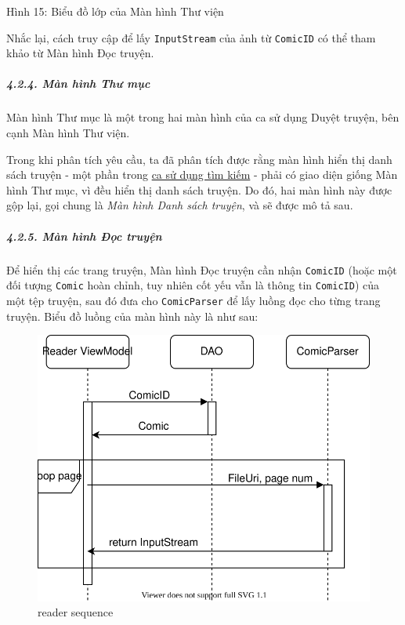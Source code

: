 \documentclass[
]{article}
\begin{document}
Hình 15: Biểu đồ lớp của Màn hình Thư viện

Nhắc lại, cách truy cập để lấy \texttt{InputStream} của ảnh từ
\texttt{ComicID} có thể tham khảo từ Màn hình Đọc truyện.

\hypertarget{muxe0n-huxecnh-thux1b0-mux1ee5c}{%
\subparagraph{\texorpdfstring{4.2.4. Màn hình Thư mục
}{4.2.4. Màn hình Thư mục }}\label{muxe0n-huxecnh-thux1b0-mux1ee5c}}

Màn hình Thư mục là một trong hai màn hình của ca sử dụng Duyệt truyện,
bên cạnh Màn hình Thư viện.

Trong khi phân tích yêu cầu, ta đã phân tích được rằng màn hình hiển thị
danh sách truyện - một phần trong
\protect\hyperlink{P3.3.5-search-comic}{ca sử dụng tìm kiếm} - phải có
giao diện giống Màn hình Thư mục, vì đều hiển thị danh sách truyện. Do
đó, hai màn hình này được gộp lại, gọi chung là \emph{Màn hình Danh sách
truyện}, và sẽ được mô tả sau.

\hypertarget{muxe0n-huxecnh-ux111ux1ecdc-truyux1ec7n}{%
\subparagraph{\texorpdfstring{4.2.5. Màn hình Đọc truyện
}{4.2.5. Màn hình Đọc truyện }}\label{muxe0n-huxecnh-ux111ux1ecdc-truyux1ec7n}}

Để hiển thị các trang truyện, Màn hình Đọc truyện cần nhận
\texttt{ComicID} (hoặc một đối tượng \texttt{Comic} hoàn chỉnh, tuy
nhiên cốt yếu vẫn là thông tin \texttt{ComicID}) của một tệp truyện, sau
đó đưa cho \texttt{ComicParser} để lấy luồng đọc cho từng trang truyện.
Biểu đồ luồng của màn hình này là như sau:

\begin{figure}
\centering
\includegraphics{../images/reader_sequence.svg}
\caption{reader sequence}
\end{figure}
\end{document}
